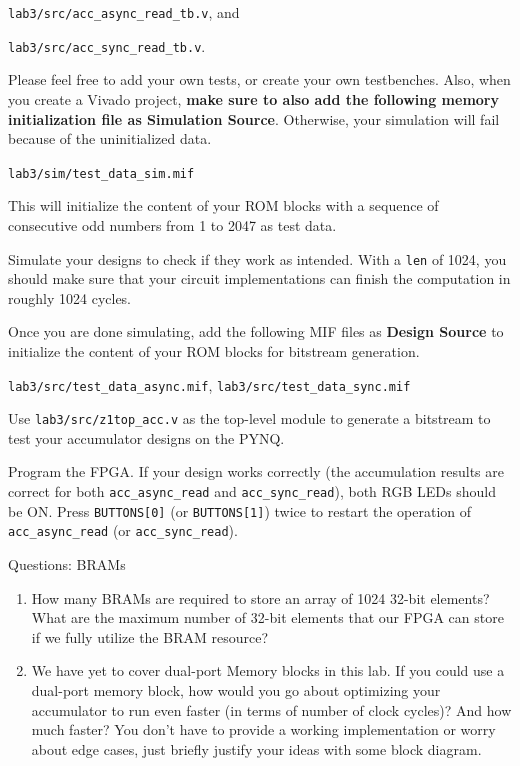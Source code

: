 \documentclass[11pt]{article}
\makeatletter
\renewcommand{\subsection}
{\@startsection {subsection}{1}{0pt}
 {-1ex}
 {0.5ex}
 {\bfseries\normalsize}}
\makeatother
\begin{document}
{\verb|lab3/src/acc_async_read_tb.v|, and

\verb|lab3/src/acc_sync_read_tb.v|.

Please feel free to add your own tests, or create your own testbenches. Also, when you create a Vivado project, \textbf{make sure to also add the following memory initialization file as Simulation Source}. Otherwise, your simulation will fail because of the uninitialized data.

\verb|lab3/sim/test_data_sim.mif|

This will initialize the content of your ROM blocks with a sequence of consecutive odd numbers from 1 to 2047 as test data.

Simulate your designs to check if they work as intended.
With a \verb|len| of 1024, you should make sure that your circuit implementations can finish the computation in roughly 1024 cycles.

Once you are done simulating, add the following MIF files as \textbf{Design Source} to initialize the content of your ROM blocks for bitstream generation.

\verb|lab3/src/test_data_async.mif|, 
\verb|lab3/src/test_data_sync.mif|

Use \verb|lab3/src/z1top_acc.v| as the top-level module to generate a bitstream to test your accumulator designs on the PYNQ. 

Program the FPGA. If your design works correctly (the accumulation results are correct for both \verb|acc_async_read| and \verb|acc_sync_read|), both RGB LEDs should be ON. Press \texttt{BUTTONS[0]} (or \texttt{BUTTONS[1]}) twice to restart the operation of \verb|acc_async_read| (or \verb|acc_sync_read|).

\subsection{Questions: BRAMs}\label{sec:Q3}
\begin{enumerate}
\item How many BRAMs are required to store an array of 1024 32-bit elements? What are the maximum number of 32-bit elements that our FPGA can store if we fully utilize the BRAM resource?
\item We have yet to cover dual-port Memory blocks in this lab. If you could use a dual-port memory block, how would you go about optimizing your accumulator to run even faster (in terms of number of clock cycles)? And how much faster? You don't have to provide a working implementation or worry about edge cases, just briefly justify your ideas with some block diagram.


\end{enumerate}}
\end{document}
